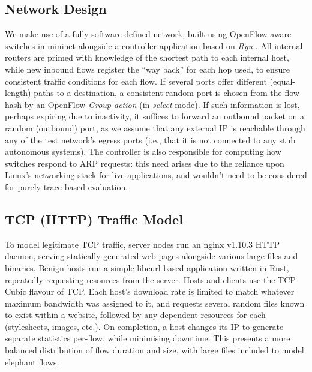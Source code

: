 \documentclass[10pt, times, conference, letterpaper]{IEEEtran}
\begin{document}
\subsection{Network Design}
We make use of a fully software-defined network, built using OpenFlow-aware switches in mininet alongside a controller application based on \emph{Ryu} \cite{ryu}.
All internal routers are primed with knowledge of the shortest path to each internal host, while new inbound flows register the ``way back'' for each hop used, to ensure consistent traffic conditions for each flow.
If several ports offer different (equal-length) paths to a destination, a consistent random port is chosen from the flow-hash by an OpenFlow \emph{Group action} (in \emph{select} mode).
If such information is lost, perhaps expiring due to inactivity, it suffices to forward an outbound packet on a random (outbound) port, as we assume that any external IP is reachable through any of the test network's egress ports (i.e., that it is not connected to any stub autonomous systems).
The controller is also responsible for computing how switches respond to ARP requests: this need arises due to the reliance upon Linux's networking stack for live applications, and wouldn't need to be considered for purely trace-based evaluation.

\subsection{TCP (HTTP) Traffic Model}
To model legitimate TCP traffic, server nodes run an nginx v1.10.3 HTTP daemon, serving statically generated web pages alongside various large files and binaries.
Benign hosts run a simple libcurl-based application written in Rust, repeatedly requesting resources from the server.
Hosts and clients use the TCP Cubic \cite{rfc8312} flavour of TCP.
Each host's download rate is limited to match whatever maximum bandwidth was assigned to it, and requests several random files known to exist within a website, followed by any dependent resources for each (stylesheets, images, etc.).
On completion, a host changes its IP to generate separate statistics per-flow, while minimising downtime.
This presents a more balanced distribution of flow duration and size, with large files included to model elephant flows.
\end{document}
